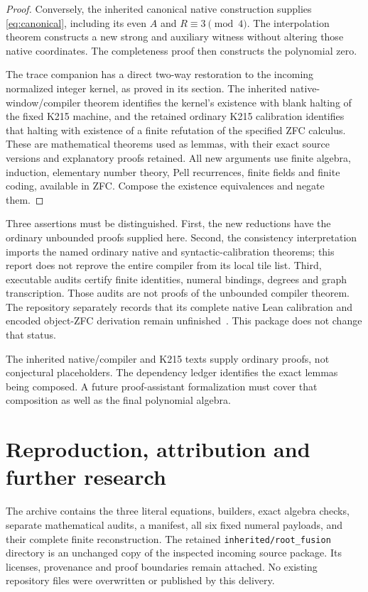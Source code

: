 \documentclass[11pt,a4paper]{article}
\theoremstyle{definition}\newtheorem{definition}[theorem]{Definition}
\theoremstyle{remark}\newtheorem{remark}[theorem]{Remark}
\numberwithin{equation}{section}
\begin{document}
\begin{proof}
Conversely, the inherited canonical native construction supplies
\eqref{eq:canonical}, including its even $A$ and $R\equiv3\pmod4$.
The interpolation theorem constructs a new strong and auxiliary witness
without altering those native coordinates. The completeness proof then
constructs the polynomial zero.

The trace companion has a direct two-way restoration to the incoming
normalized integer kernel, as proved in its section. The inherited
native-window/compiler theorem identifies the kernel's existence with
blank halting of the fixed K215 machine, and the retained ordinary K215
calibration identifies that halting with existence of a finite refutation
of the specified ZFC calculus. These are mathematical theorems used as
lemmas, with their exact source versions and explanatory proofs retained.
All new arguments use finite algebra, induction, elementary number theory,
Pell recurrences, finite fields and finite coding, available in ZFC.
Compose the existence equivalences and negate them.
\end{proof}

Three assertions must be distinguished. First, the new reductions have
the ordinary unbounded proofs supplied here. Second, the consistency
interpretation imports the named ordinary native and syntactic-calibration
theorems; this report does not reprove the entire compiler from its local
tile list. Third, executable audits certify finite identities, numeral
bindings, degrees and graph transcription. Those audits are not proofs of
the unbounded compiler theorem. The repository separately records that its
complete native Lean calibration and encoded object-ZFC derivation remain
unfinished~\cite{active,boundary}. This package does not change that status.

The inherited native/compiler and K215 texts supply ordinary proofs, not
conjectural placeholders. The dependency ledger identifies the exact lemmas
being composed. A future proof-assistant formalization must cover that
composition as well as the final polynomial algebra.

\section{Reproduction, attribution and further research}

The archive contains the three literal equations, builders, exact algebra
checks, separate mathematical audits, a manifest, all six fixed numeral
payloads, and their complete finite reconstruction. The retained
\texttt{inherited/root\_fusion} directory is an unchanged copy of the
inspected incoming source package. Its licenses, provenance and proof
boundaries remain attached. No existing repository files were overwritten
or published by this delivery.
\end{document}
